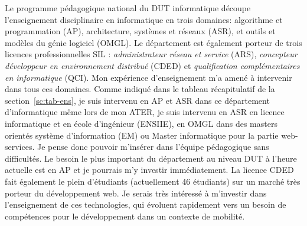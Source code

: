 \documentclass[11pt]{article}
\begin{document}
Le programme pédagogique national du DUT informatique découpe l'enseignement disciplinaire 
en informatique en trois domaines: algorithme et programmation (AP), architecture, systèmes 
et réseaux (ASR), et outils et modèles du génie logiciel (OMGL). Le département est également
porteur de trois licences professionnelles SIL : \textit{administrateur réseau et service} 
(ARS), \textit{concepteur développeur en environnement distribué} (CDED) et 
\textit{qualification complémentaires en informatique} (QCI).
Mon expérience d'enseignement m'a amené à intervenir dans tous ces domaines. Comme indiqué 
dans le tableau récapitulatif de la section~\ref{sc:tab-ens}, je suis intervenu en AP et ASR 
dans ce département d'informatique même lors de mon ATER, je suis intervenu en ASR en licence 
informatique et en école d'ingénieur (ENSIIE), en OMGL dans des masters orientés système 
d'information (EM) ou Master informatique pour la partie web-services.
Je pense donc pouvoir m'insérer dans l'équipe pédagogique sans difficultés. Le besoin le plus 
important du département au niveau DUT à l'heure actuelle est en AP et je pourrais m'y investir 
immédiatement. La licence CDED fait également le plein d'étudiants (actuellement 46 étudiants)
sur un marché très porteur du développement web. Je serais très intéressé à m'investir dans
l'enseignement de ces technologies, qui évoluent rapidement vers un besoin de compétences
pour le développement dans un contexte de mobilité.\\
\end{document}
